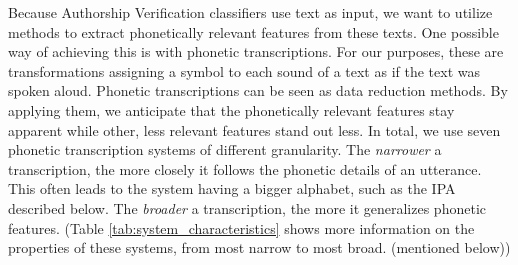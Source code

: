 Because Authorship Verification classifiers use text as input, we want to utilize methods to extract phonetically relevant features from these texts.
One possible way of achieving this is with phonetic transcriptions.
For our purposes, these are transformations assigning a symbol to each sound of a text as if the text was spoken aloud.
Phonetic transcriptions can be seen as data reduction methods.
By applying them, we anticipate that the phonetically relevant features stay apparent while other, less relevant features stand out less.
In total, we use seven phonetic transcription systems of different granularity.
The \textit{narrower} a transcription, the more closely it follows the phonetic details of an utterance.
This often leads to the system having a bigger alphabet, such as the IPA described below.
The \textit{broader} a transcription, the more it generalizes phonetic features.
(Table \ref{tab:system_characteristics} shows more information on the properties of these systems, from most narrow to most broad. (mentioned below))\\

